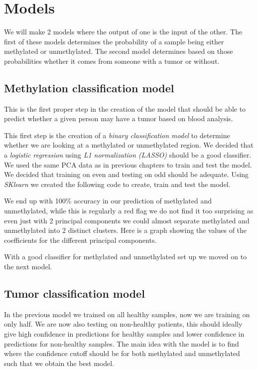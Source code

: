 \chapter{Models}
We will make 2 models where the output of one is the input of the other. The first of these models determines the probability of a sample being either methylated or unmethylated. The second model determines based on those probabilities whether it comes from someone with a tumor or without. 
\section{Methylation  classification model}
This is the first proper step in the creation of the model that should be able to predict whether a given person may have a tumor based on blood analysis.

This first step is the creation of a \textit{binary classification model} to determine whether we are looking at a methylated or unmethylated region. We decided that a \textit{logistic regression} using \textit{L1 normalization (LASSO)} should be a good classifier. We used the same PCA data as in previous chapters to train and test the model. We decided that training on even and testing on odd should be adequate. Using \textit{SKlearn} we created the following code to create, train and test the model.

We end up with 100\% accuracy in our prediction of methylated and unmethylated, while this is regularly a red flag we do not find it too surprising as even just with 2 principal components we could almost separate methylated and unmethylated into 2 distinct clusters. Here is a graph showing the values of the coefficients for the different principal components.

With a good classifier for methylated and unmethylated set up we moved on to the next model.
\section{Tumor classification model}
In the previous model we trained on all healthy samples, now we are training on only half. We are now also testing on non-healthy patients, this should ideally give high confidence in predictions for healthy samples and lower confidence in predictions for non-healthy samples. The main idea with the model is to find where the confidence cutoff should be for both methylated and unmethylated such that we obtain the best model.

